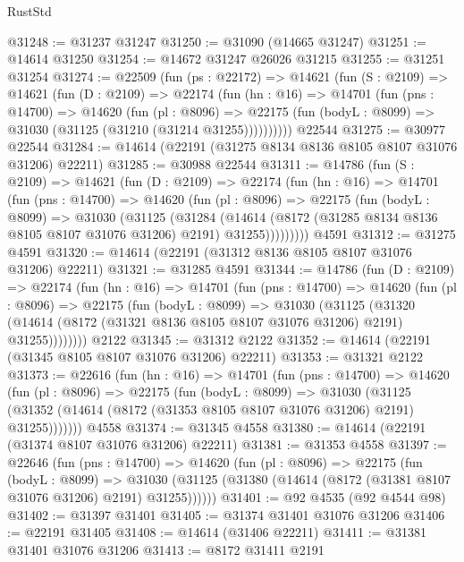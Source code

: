\begin{lexlean}{RustStd}
\begin{coremodule}
@31248 := @31237 @31247
@31250 := @31090 (@14665 @31247)
@31251 := @14614 @31250
@31254 := @14672 @31247 @26026 @31215
@31255 := @31251 @31254
@31274 := @22509
    (fun (ps : @22172) =>
    @14621
      (fun (S : @2109) =>
      @14621
        (fun (D : @2109) =>
        @22174
          (fun (hn : @16) =>
          @14701
            (fun (pns : @14700) =>
            @14620
              (fun (pl : @8096) =>
              @22175 (fun (bodyL : @8099) => @31030 (@31125 (@31210 (@31214 @31255))))))))))
    @22544
@31275 := @30977 @22544
@31284 := @14614 (@22191 (@31275 @8134 @8136 @8105 @8107 @31076 @31206) @22211)
@31285 := @30988 @22544
@31311 := @14786
    (fun (S : @2109) =>
    @14621
      (fun (D : @2109) =>
      @22174
        (fun (hn : @16) =>
        @14701
          (fun (pns : @14700) =>
          @14620
            (fun (pl : @8096) =>
            @22175
              (fun (bodyL : @8099) =>
              @31030
                (@31125
                  (@31284
                    (@14614
                      (@8172 (@31285 @8134 @8136 @8105 @8107 @31076 @31206) @2191)
                      @31255)))))))))
    @4591
@31312 := @31275 @4591
@31320 := @14614 (@22191 (@31312 @8136 @8105 @8107 @31076 @31206) @22211)
@31321 := @31285 @4591
@31344 := @14786
    (fun (D : @2109) =>
    @22174
      (fun (hn : @16) =>
      @14701
        (fun (pns : @14700) =>
        @14620
          (fun (pl : @8096) =>
          @22175
            (fun (bodyL : @8099) =>
            @31030
              (@31125
                (@31320
                  (@14614 (@8172 (@31321 @8136 @8105 @8107 @31076 @31206) @2191) @31255))))))))
    @2122
@31345 := @31312 @2122
@31352 := @14614 (@22191 (@31345 @8105 @8107 @31076 @31206) @22211)
@31353 := @31321 @2122
@31373 := @22616
    (fun (hn : @16) =>
    @14701
      (fun (pns : @14700) =>
      @14620
        (fun (pl : @8096) =>
        @22175
          (fun (bodyL : @8099) =>
          @31030
            (@31125 (@31352 (@14614 (@8172 (@31353 @8105 @8107 @31076 @31206) @2191) @31255)))))))
    @4558
@31374 := @31345 @4558
@31380 := @14614 (@22191 (@31374 @8107 @31076 @31206) @22211)
@31381 := @31353 @4558
@31397 := @22646
    (fun (pns : @14700) =>
    @14620
      (fun (pl : @8096) =>
      @22175
        (fun (bodyL : @8099) =>
        @31030 (@31125 (@31380 (@14614 (@8172 (@31381 @8107 @31076 @31206) @2191) @31255))))))
@31401 := @92 @4535 (@92 @4544 @98)
@31402 := @31397 @31401
@31405 := @31374 @31401 @31076 @31206
@31406 := @22191 @31405
@31408 := @14614 (@31406 @22211)
@31411 := @31381 @31401 @31076 @31206
@31413 := @8172 @31411 @2191

\end{coremodule}
\end{lexlean}
